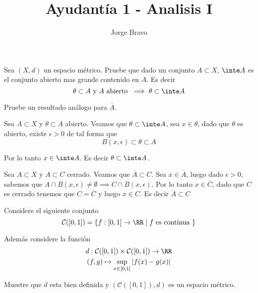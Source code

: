 \documentclass[a4paper,oneside,10.5pt]{USMArt}
\title{Ayudantía 1 - Analisis I}
\author{Jorge Bravo}
\begin{document}
\maketitle

\begin{prob}
  Sea $(X, d)$ un espacio métrico. Pruebe que dado un conjunto $A \subset X$, $\inte A$ es el conjunto abierto mas grande contenido en $A$. Es decir
  \begin{equation*}
    \theta \subset A \text{ y } A \text{ abierto } \implies \theta \subset \inte A
  \end{equation*}

  Pruebe un resultado análogo para $\overline{A}$.
\end{prob}

\begin{sol}
  Sea $A \subset X$ y $\theta \subset A$ abierto. Veamos que $\theta \subset \inte A$, sea $x \in \theta$, dado que $\theta$ es abierto, existe $\epsilon > 0$ de tal forma que
  \begin{equation*}
    B(x, \epsilon) \subset \theta \subset A
  \end{equation*}

  Por lo tanto $x \in \inte A$. Es decir $\theta \subset \inte A$.
  \newline

  Sea $A \subset X$ y $A \subset C$ cerrado. Veamos que $\overline{A} \subset C$. Sea $x \in \overline{A}$, luego dado $\epsilon > 0$, sabemos que $A \cap B(x, \epsilon) \neq \emptyset \implies C \cap B(x, \epsilon)$. Por lo tanto $x \in \overline{C}$, dado que $C$ es cerrado tenemos que $C = \overline{C}$ y luego $x \in C$.
  Es decir $\overline{A} \subset C$
\end{sol}

\begin{prob}
  Considere el siguiente conjunto
  \begin{equation*}
    \mathcal{C}([0, 1]) = \{f : [0, 1] \to \RR \; | \; f \text{ es continua }\}
  \end{equation*}

  Además considere la función
  \begin{gather*}
    d : \mathcal{C}([0, 1]) \times \mathcal{C}([0, 1]) \to \RR\\
    (f, g) \mapsto \sup_{x \in [0, 1]} |f(x) - g(x)|
  \end{gather*}

  Muestre que $d$ esta bien definida y $(\mathcal{C}([0, 1]), d)$ es un espacio métrico.
\end{prob}
\end{document}
